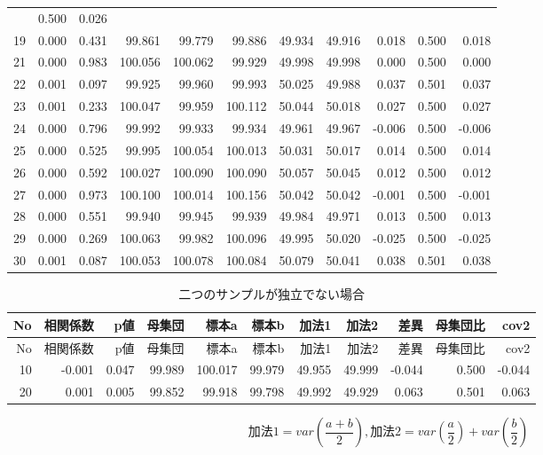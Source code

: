 \documentclass[]{tufte-handout}
\begin{document}
\begin{longtable}[]{@{}rrrrrrrrrrr@{}}
& 0.500 & 0.026 \\
19 & 0.000 & 0.431 & 99.861 & 99.779 & 99.886 & 49.934 & 49.916 & 0.018
& 0.500 & 0.018 \\
21 & 0.000 & 0.983 & 100.056 & 100.062 & 99.929 & 49.998 & 49.998 &
0.000 & 0.500 & 0.000 \\
22 & 0.001 & 0.097 & 99.925 & 99.960 & 99.993 & 50.025 & 49.988 & 0.037
& 0.501 & 0.037 \\
23 & 0.001 & 0.233 & 100.047 & 99.959 & 100.112 & 50.044 & 50.018 &
0.027 & 0.500 & 0.027 \\
24 & 0.000 & 0.796 & 99.992 & 99.933 & 99.934 & 49.961 & 49.967 & -0.006
& 0.500 & -0.006 \\
25 & 0.000 & 0.525 & 99.995 & 100.054 & 100.013 & 50.031 & 50.017 &
0.014 & 0.500 & 0.014 \\
26 & 0.000 & 0.592 & 100.027 & 100.090 & 100.090 & 50.057 & 50.045 &
0.012 & 0.500 & 0.012 \\
27 & 0.000 & 0.973 & 100.100 & 100.014 & 100.156 & 50.042 & 50.042 &
-0.001 & 0.500 & -0.001 \\
28 & 0.000 & 0.551 & 99.940 & 99.945 & 99.939 & 49.984 & 49.971 & 0.013
& 0.500 & 0.013 \\
29 & 0.000 & 0.269 & 100.063 & 99.982 & 100.096 & 49.995 & 50.020 &
-0.025 & 0.500 & -0.025 \\
30 & 0.001 & 0.087 & 100.053 & 100.078 & 100.084 & 50.079 & 50.041 &
0.038 & 0.501 & 0.038 \\
\bottomrule
\end{longtable}

\begin{longtable}[]{@{}rrrrrrrrrrr@{}}
\caption{二つのサンプルが独立でない場合}\tabularnewline
\toprule
No & 相関係数 & p値 & 母集団 & 標本a & 標本b & 加法1 & 加法2 & 差異 &
母集団比 & cov2 \\
\midrule
\endfirsthead
\toprule
No & 相関係数 & p値 & 母集団 & 標本a & 標本b & 加法1 & 加法2 & 差異 &
母集団比 & cov2 \\
\midrule
\endhead
10 & -0.001 & 0.047 & 99.989 & 100.017 & 99.979 & 49.955 & 49.999 &
-0.044 & 0.500 & -0.044 \\
20 & 0.001 & 0.005 & 99.852 & 99.918 & 99.798 & 49.992 & 49.929 & 0.063
& 0.501 & 0.063 \\
\bottomrule
\end{longtable}

\[\mbox{加法1} = var(\frac{a + b}{2}),　\mbox{加法2} = var(\frac{a}{2}) + var(\frac{b}{2})\]

\newpage
\end{document}

